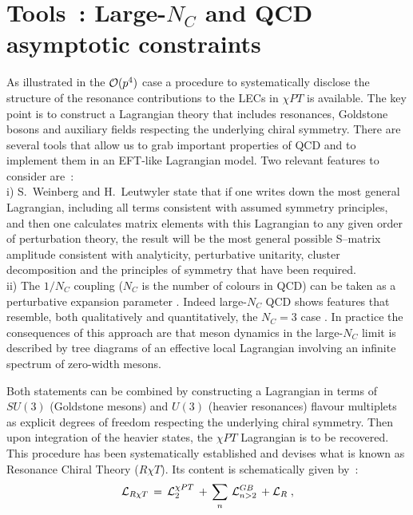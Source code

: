 \documentclass{appolb}
\begin{document}
\section{Tools~: Large-$N_C$ and QCD asymptotic constraints}
As illustrated in the ${\cal O}(p^4)$ case \cite{Ecker:1988te,Ecker:1989yg} a procedure to systematically 
disclose the structure of the resonance contributions to the LECs in $\chi PT$ is available. 
The key point is to construct a Lagrangian theory that includes resonances, Goldstone bosons and
auxiliary fields respecting the underlying chiral symmetry. There are several tools that allow us to grab important properties of QCD and to implement them in an EFT-like Lagrangian model. Two relevant features
to consider are~:
\vspace*{0.2cm} \\
i) S.~Weinberg \cite{Weinberg:1978kz} and H.~Leutwyler \cite{Leutwyler:1993iq}
state that if one writes down the most general Lagrangian, including all terms consistent with  
assumed symmetry principles, and then one calculates matrix elements with this Lagrangian to any 
given order of perturbation theory, the result will be the most general possible S--matrix amplitude consistent with analyticity, perturbative unitarity, cluster decomposition and the principles of 
symmetry that have been required. 
\vspace*{0.1cm} \\
ii) The $1/N_C$ coupling ($N_C$ is the number of colours in QCD) can be taken as a perturbative expansion
parameter \cite{'tHooft:1974hx}. Indeed large-$N_C$ QCD shows features that resemble, 
both qualitatively and quantitatively, the $N_C=3$ case \cite{Peris:1998nj}. In practice the consequences of this approach are that meson dynamics in the large-$N_C$ limit
is described by tree diagrams of an effective local Lagrangian involving an infinite spectrum of zero-width mesons.
\vspace*{0.2cm} 
\par
Both statements can be combined by constructing a Lagrangian in terms of $SU(3)$ (Goldstone mesons) 
and $U(3)$ (heavier resonances) flavour multiplets as explicit degrees of freedom respecting the underlying chiral symmetry. Then upon integration of the heavier states, the $\chi PT$ Lagrangian is to be recovered. 
This procedure has been systematically established \cite{Ecker:1988te,Ecker:1989yg,Cirigliano:2006hb} 
and devises what is known as Resonance Chiral Theory ($R \chi T$). Its content is schematically given by~:
\begin{equation} \label{eq:GBdisc}
{\cal L}_{R \chi T} \, = \, {\cal L}_2^{\chi PT} \, + \, \sum_n \, {\cal L}_{n>2}^{GB} \, + {\cal L}_R \; , 
\end{equation}
\end{document}
